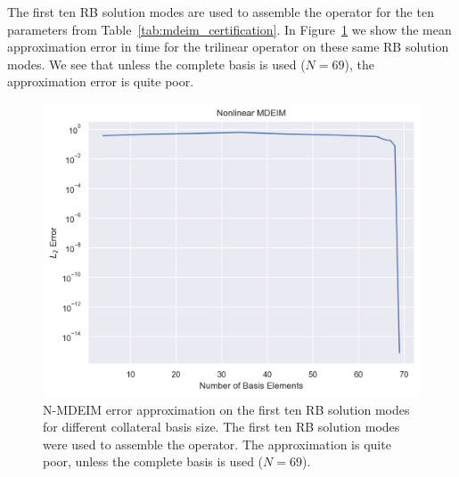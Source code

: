 \documentclass[../../thesis.tex]{subfiles}
\begin{document}
The first ten RB solution modes are used to assemble the operator for the ten parameters
from Table~\ref{tab:mdeim_certification}.
In Figure~\ref{fig:mdeim_error_approximation} we show the mean approximation error
in time for the trilinear operator on these same RB solution modes. 
We see that unless the complete basis is used ($N=69$),
the approximation error is quite poor.
\begin{figure}[h]
    \centering
    \includegraphics[width=1\columnwidth]{research_project/piston/figures/mdeim_certification/nonlinear_error_decay.png}
    \caption{N-MDEIM error approximation on the first ten RB solution modes 
    for different collateral basis size.
    The first ten RB solution modes were used to assemble the operator.
    The approximation is quite poor, unless the complete basis is used 
    ($N=69$).}
    \label{fig:mdeim_error_approximation}
\end{figure}
\end{document}
